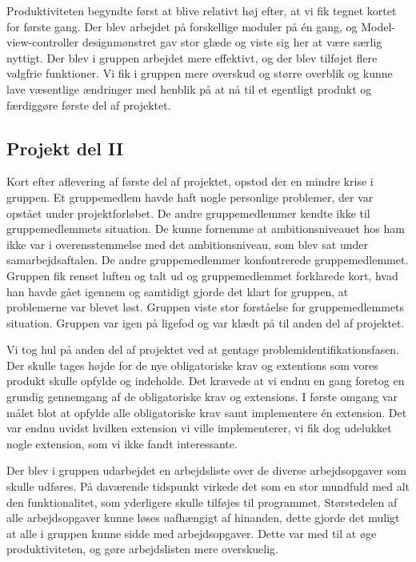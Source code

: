 Produktiviteten begyndte først at blive relativt høj efter, at vi fik tegnet kortet for første gang. Der blev arbejdet på forskellige moduler på én gang, og Model-view-controller designmønstret gav stor glæde og viste sig her at være særlig nyttigt. Der blev i gruppen arbejdet mere effektivt, og der blev tilføjet flere valgfrie funktioner. Vi fik i gruppen mere overskud og større overblik og kunne lave væsentlige ændringer med henblik på at nå til et egentligt produkt og færdiggøre første del af projektet. 


\subsection{Projekt del II}

Kort efter aflevering af første del af projektet, opstod der en mindre krise i gruppen. Et gruppemedlem havde haft nogle personlige problemer, der var opstået under projektforløbet. De andre gruppemedlemmer kendte ikke til gruppemedlemmets situation. De kunne fornemme at ambitionsniveauet hos ham ikke var i overensstemmelse med det ambitionsniveau, som blev sat under samarbejdsaftalen. De andre gruppemedlemmer konfontrerede gruppemedlemmet. Gruppen fik renset luften og talt ud og gruppemedlemmet forklarede kort, hvad han havde gået igennem og samtidigt gjorde det klart for gruppen, at problemerne var blevet løst. Gruppen viste stor forståelse for gruppemedlemmets situation. Gruppen var igen på ligefod og var klædt på til anden del af projektet. 

Vi tog hul på anden del af projektet ved at gentage problemidentifikationsfasen. Der skulle tages højde for de nye obligatoriske krav og extentions som vores produkt skulle opfylde og indeholde. Det krævede at vi endnu en gang foretog en grundig gennemgang af de obligatoriske krav og extensions. I første omgang var målet blot at opfylde alle obligatoriske krav samt implementere én extension. Det var endnu uvidst hvilken extension vi ville implementerer, vi fik dog udelukket nogle extension, som vi ikke fandt interessante. 

Der blev i gruppen udarbejdet en arbejdsliste over de diverse arbejdsopgaver som skulle udføres. På daværende tidspunkt virkede det som en stor mundfuld med alt den funktionalitet, som yderligere skulle tilføjes til programmet. Størstedelen af alle arbejdsopgaver kunne løses uafhængigt af hinanden, dette gjorde det muligt at alle i gruppen kunne sidde med arbejdsopgaver. Dette var med til at øge produktiviteten, og gøre arbejdslisten mere overskuelig.  

